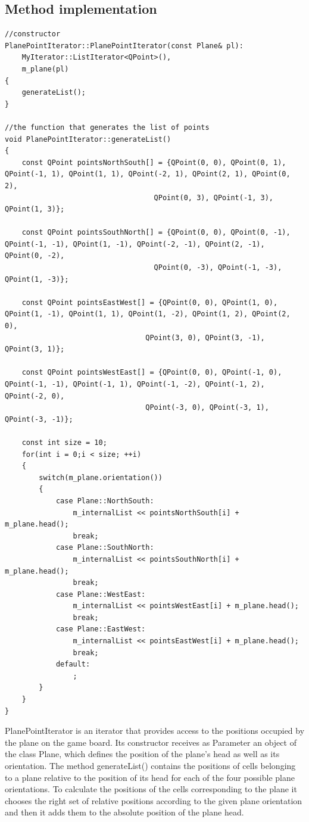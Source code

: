 \documentclass{article}
\begin{document}
\subsection {Method implementation}
\begin{lstlisting}
//constructor
PlanePointIterator::PlanePointIterator(const Plane& pl):
    MyIterator::ListIterator<QPoint>(),
    m_plane(pl)
{
    generateList();
}

//the function that generates the list of points
void PlanePointIterator::generateList()
{
    const QPoint pointsNorthSouth[] = {QPoint(0, 0), QPoint(0, 1), QPoint(-1, 1), QPoint(1, 1), QPoint(-2, 1), QPoint(2, 1), QPoint(0, 2),
                                   QPoint(0, 3), QPoint(-1, 3), QPoint(1, 3)};

    const QPoint pointsSouthNorth[] = {QPoint(0, 0), QPoint(0, -1), QPoint(-1, -1), QPoint(1, -1), QPoint(-2, -1), QPoint(2, -1), QPoint(0, -2),
                                   QPoint(0, -3), QPoint(-1, -3), QPoint(1, -3)};

    const QPoint pointsEastWest[] = {QPoint(0, 0), QPoint(1, 0), QPoint(1, -1), QPoint(1, 1), QPoint(1, -2), QPoint(1, 2), QPoint(2, 0),
                                 QPoint(3, 0), QPoint(3, -1), QPoint(3, 1)};

    const QPoint pointsWestEast[] = {QPoint(0, 0), QPoint(-1, 0), QPoint(-1, -1), QPoint(-1, 1), QPoint(-1, -2), QPoint(-1, 2), QPoint(-2, 0),
                                 QPoint(-3, 0), QPoint(-3, 1), QPoint(-3, -1)};

    const int size = 10;
    for(int i = 0;i < size; ++i)
    {
        switch(m_plane.orientation())
        {
            case Plane::NorthSouth:
                m_internalList << pointsNorthSouth[i] + m_plane.head();
                break;
            case Plane::SouthNorth:
                m_internalList << pointsSouthNorth[i] + m_plane.head();
                break;
            case Plane::WestEast:
                m_internalList << pointsWestEast[i] + m_plane.head();
                break;
            case Plane::EastWest:
                m_internalList << pointsEastWest[i] + m_plane.head();
                break;
            default:
                ;
        }
    }
}

\end{lstlisting}

PlanePointIterator is an iterator that provides access to the positions occupied by the plane on the game board. Its constructor receives as Parameter an object of the class Plane, which defines the position of the plane's head as well as its orientation. The method generateList() contains the positions of cells belonging to a plane relative to the position of its head for each of the four possible plane orientations. To calculate the positions of the cells corresponding to the plane it chooses the right set of relative positions according to the given plane orientation and then it adds them to the absolute position of the plane head.
\end{document}

